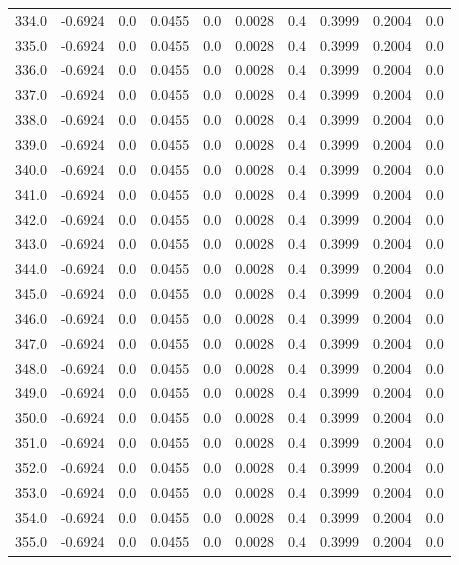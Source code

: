 \begin{longtable}{lrrrrrrrrr}
334.0 & -0.6924 & 0.0 & 0.0455 & 0.0 & 0.0028 & 0.4 & 0.3999 & 0.2004 & 0.0 \\
335.0 & -0.6924 & 0.0 & 0.0455 & 0.0 & 0.0028 & 0.4 & 0.3999 & 0.2004 & 0.0 \\
336.0 & -0.6924 & 0.0 & 0.0455 & 0.0 & 0.0028 & 0.4 & 0.3999 & 0.2004 & 0.0 \\
337.0 & -0.6924 & 0.0 & 0.0455 & 0.0 & 0.0028 & 0.4 & 0.3999 & 0.2004 & 0.0 \\
338.0 & -0.6924 & 0.0 & 0.0455 & 0.0 & 0.0028 & 0.4 & 0.3999 & 0.2004 & 0.0 \\
339.0 & -0.6924 & 0.0 & 0.0455 & 0.0 & 0.0028 & 0.4 & 0.3999 & 0.2004 & 0.0 \\
340.0 & -0.6924 & 0.0 & 0.0455 & 0.0 & 0.0028 & 0.4 & 0.3999 & 0.2004 & 0.0 \\
341.0 & -0.6924 & 0.0 & 0.0455 & 0.0 & 0.0028 & 0.4 & 0.3999 & 0.2004 & 0.0 \\
342.0 & -0.6924 & 0.0 & 0.0455 & 0.0 & 0.0028 & 0.4 & 0.3999 & 0.2004 & 0.0 \\
343.0 & -0.6924 & 0.0 & 0.0455 & 0.0 & 0.0028 & 0.4 & 0.3999 & 0.2004 & 0.0 \\
344.0 & -0.6924 & 0.0 & 0.0455 & 0.0 & 0.0028 & 0.4 & 0.3999 & 0.2004 & 0.0 \\
345.0 & -0.6924 & 0.0 & 0.0455 & 0.0 & 0.0028 & 0.4 & 0.3999 & 0.2004 & 0.0 \\
346.0 & -0.6924 & 0.0 & 0.0455 & 0.0 & 0.0028 & 0.4 & 0.3999 & 0.2004 & 0.0 \\
347.0 & -0.6924 & 0.0 & 0.0455 & 0.0 & 0.0028 & 0.4 & 0.3999 & 0.2004 & 0.0 \\
348.0 & -0.6924 & 0.0 & 0.0455 & 0.0 & 0.0028 & 0.4 & 0.3999 & 0.2004 & 0.0 \\
349.0 & -0.6924 & 0.0 & 0.0455 & 0.0 & 0.0028 & 0.4 & 0.3999 & 0.2004 & 0.0 \\
350.0 & -0.6924 & 0.0 & 0.0455 & 0.0 & 0.0028 & 0.4 & 0.3999 & 0.2004 & 0.0 \\
351.0 & -0.6924 & 0.0 & 0.0455 & 0.0 & 0.0028 & 0.4 & 0.3999 & 0.2004 & 0.0 \\
352.0 & -0.6924 & 0.0 & 0.0455 & 0.0 & 0.0028 & 0.4 & 0.3999 & 0.2004 & 0.0 \\
353.0 & -0.6924 & 0.0 & 0.0455 & 0.0 & 0.0028 & 0.4 & 0.3999 & 0.2004 & 0.0 \\
354.0 & -0.6924 & 0.0 & 0.0455 & 0.0 & 0.0028 & 0.4 & 0.3999 & 0.2004 & 0.0 \\
355.0 & -0.6924 & 0.0 & 0.0455 & 0.0 & 0.0028 & 0.4 & 0.3999 & 0.2004 & 0.0 \\

\end{longtable}
